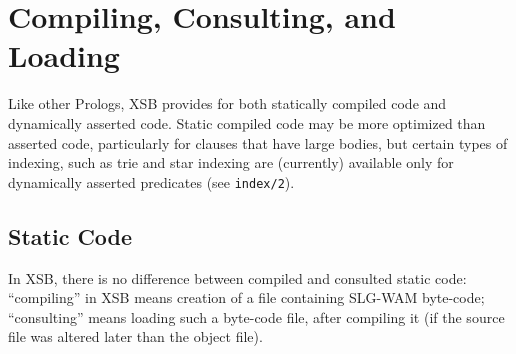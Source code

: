 \section{Compiling, Consulting, and Loading} \label{Consulting}
Like other Prologs, XSB provides for both statically compiled code and
dynamically asserted code.  Static compiled code may be more optimized
than asserted code, particularly for clauses that have large bodies,
but certain types of indexing, such as trie and star indexing are
(currently) available only for dynamically asserted predicates (see
{\tt index/2}).

\subsection{Static Code}
%
In XSB, there is no difference between compiled and consulted static
code: ``compiling'' in XSB means creation of a file containing SLG-WAM
byte-code; ``consulting'' means loading such a byte-code file, after
compiling it (if the source file was altered later than the object
file).

